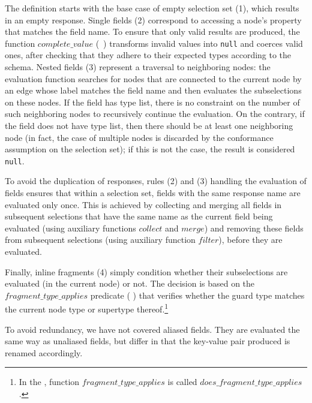 The definition starts with the base case of empty selection set (1),
which results in an empty response.  Single fields (2) correspond to
accessing a node's property that matches the field name.  To ensure
that only valid results are produced, the function
$\mathit{complete\_value}$ (\cf~\cite[\S6.4.3]{gqlspec}) transforms
invalid values into \texttt{null} and coerces valid ones, after
checking that they adhere to their expected types according to the
schema. %
Nested fields (3) represent a traversal to neighboring nodes: the
evaluation function searches for nodes that are connected to the
current node by an edge whose label matches the field name and then
evaluates the subselections on these nodes. If the field has type
list, there is no constraint on the number of such neighboring nodes
to recursively continue the evaluation. On the contrary, if the field
does not have type list, then there should be at least one neighboring
node (in fact, the case of multiple nodes is discarded by the
conformance assumption on the selection set); if this is not the case,
the result is considered \texttt{null}.

To avoid the duplication of responses, rules (2) and (3) handling the
evaluation of fields ensures that within a selection set, fields with the same
response name are evaluated only once. This is achieved by collecting
and merging all fields in subsequent selections that have the same
name as the current field being evaluated (using auxiliary functions
$\mathit{collect}$ and $\mathit{merge}$) and removing these fields
from subsequent selections (using auxiliary function
$\mathit{filter}$), before they are evaluated.

Finally, inline fragments (4) simply condition whether their
subselections are evaluated (in the current node) or not. The decision
is based on the $\mathit{fragment\_type\_applies}$ predicate (\cf
\cite[\S6.3.2]{gqlspec}) that verifies whether the guard type matches
the current node type or supertype thereof.\footnote{In the \spec,
  function $\mathit{fragment\_type\_applies}$ is called $\mathit{does\_fragment\_type\_applies}$.}

To avoid redundancy, we have not covered aliased fields. They are
evaluated the same way as unaliased fields, but differ in that the
key-value pair produced is renamed accordingly.


